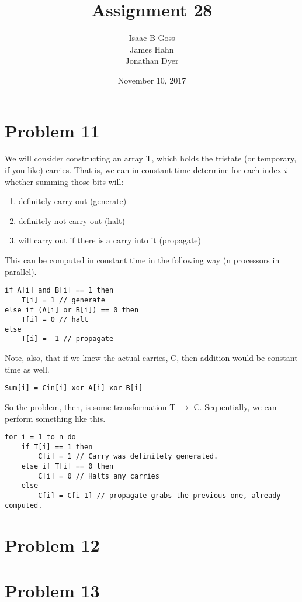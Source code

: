 \documentclass{article}
\author{Isaac B Goss\\ James Hahn\\ Jonathan Dyer}
\date{November 10, 2017}
\title{Assignment 28}
\providecommand{\prob}[1]{\section*{Problem #1}}
\providecommand{\tightlist}{
    \setlength{\itemsep}{0pt}\setlength{\parskip}{0pt}
}
\begin{document}
\maketitle
    \prob{11}
    We will consider constructing an array T, which holds the tristate (or temporary, if you like) carries.
    That is, we can in constant time determine for each index $i$ whether summing those bits will:
    \begin{enumerate}\tightlist
        \item definitely carry out (generate)
        \item definitely not carry out (halt)
        \item will carry out if there is a carry into it (propagate)
    \end{enumerate}
    This can be computed in constant time in the following way (n processors in parallel).
    \begin{lstlisting}
if A[i] and B[i] == 1 then
    T[i] = 1 // generate
else if (A[i] or B[i]) == 0 then
    T[i] = 0 // halt
else
    T[i] = -1 // propagate
    \end{lstlisting}
    Note, also, that if we knew the actual carries, C, then addition would be constant time as well.
    \begin{lstlisting}
Sum[i] = Cin[i] xor A[i] xor B[i]
    \end{lstlisting}

    So the problem, then, is some transformation T $\to$ C.
    Sequentially, we can perform something like this.
    \begin{lstlisting}
for i = 1 to n do
    if T[i] == 1 then
        C[i] = 1 // Carry was definitely generated.
    else if T[i] == 0 then
        C[i] = 0 // Halts any carries
    else
        C[i] = C[i-1] // propagate grabs the previous one, already computed.
    \end{lstlisting}
    \prob{12}

    \prob{13}
\end{document}
